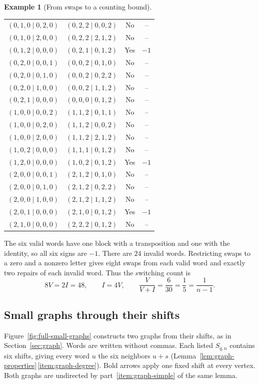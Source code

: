 \documentclass[11pt,a4paper]{article}
\numberwithin{equation}{section}
\numberwithin{figure}{section}
\numberwithin{table}{section}
\numberwithin{footnote}{section}
\theoremstyle{informal}\newtheorem*{informaltheorem}{Informal theorem}
\theoremstyle{definition}\newtheorem{example}{Example}[section]
\theoremstyle{remark}\newtheorem{remark}[theorem]{Remark}
\begin{document}
\begin{example}[From swaps to a counting bound]
\begin{longtable}{@{}cccc@{}}
\((0,1,0\mid 0,2,0)\) & \((0,2,2\mid 0,0,2)\) & No & \(\text{--}\) \\
\((0,1,0\mid 2,0,0)\) & \((0,2,2\mid 2,1,2)\) & No & \(\text{--}\) \\
\((0,1,2\mid 0,0,0)\) & \((0,2,1\mid 0,1,2)\) & Yes & \(-1\) \\
\((0,2,0\mid 0,0,1)\) & \((0,0,2\mid 0,1,0)\) & No & \(\text{--}\) \\
\((0,2,0\mid 0,1,0)\) & \((0,0,2\mid 0,2,2)\) & No & \(\text{--}\) \\
\((0,2,0\mid 1,0,0)\) & \((0,0,2\mid 1,1,2)\) & No & \(\text{--}\) \\
\((0,2,1\mid 0,0,0)\) & \((0,0,0\mid 0,1,2)\) & No & \(\text{--}\) \\
\((1,0,0\mid 0,0,2)\) & \((1,1,2\mid 0,1,1)\) & No & \(\text{--}\) \\
\((1,0,0\mid 0,2,0)\) & \((1,1,2\mid 0,0,2)\) & No & \(\text{--}\) \\
\((1,0,0\mid 2,0,0)\) & \((1,1,2\mid 2,1,2)\) & No & \(\text{--}\) \\
\((1,0,2\mid 0,0,0)\) & \((1,1,1\mid 0,1,2)\) & No & \(\text{--}\) \\
\((1,2,0\mid 0,0,0)\) & \((1,0,2\mid 0,1,2)\) & Yes & \(-1\) \\
\((2,0,0\mid 0,0,1)\) & \((2,1,2\mid 0,1,0)\) & No & \(\text{--}\) \\
\((2,0,0\mid 0,1,0)\) & \((2,1,2\mid 0,2,2)\) & No & \(\text{--}\) \\
\((2,0,0\mid 1,0,0)\) & \((2,1,2\mid 1,1,2)\) & No & \(\text{--}\) \\
\((2,0,1\mid 0,0,0)\) & \((2,1,0\mid 0,1,2)\) & Yes & \(-1\) \\
\((2,1,0\mid 0,0,0)\) & \((2,2,2\mid 0,1,2)\) & No & \(\text{--}\) \\
\end{longtable}
\endgroup
The six valid words have one block with a transposition and one
with the identity, so all six signs are \(-1\). There are
\(24\) invalid words. Restricting swaps to a zero and a nonzero
letter gives eight swaps from each valid word and exactly two
repairs of each invalid word. Thus the switching count is
\begin{equation}
 8V=2I=48,\qquad I=4V,\qquad
 \frac{V}{V+I}=\frac6{30}=\frac15=\frac1{n-1}.
\end{equation}
\end{example}

\subsection{Small graphs through their shifts}\label{app:full-graphs}
Figure~\ref{fig:full-small-graphs} constructs two graphs from their
shifts, as in Section~\ref{sec:graph}. Words are written without commas.
Each listed \(S_{q,n}\) contains six shifts, giving every word \(u\)
the six neighbors \(u+s\)
(Lemma~\ref{lem:graph-properties}\,\ref{item:graph-degree}).
Bold arrows apply one fixed shift at every vertex. Both graphs are
undirected by part~\ref{item:graph-simple} of the same lemma.
\end{document}
